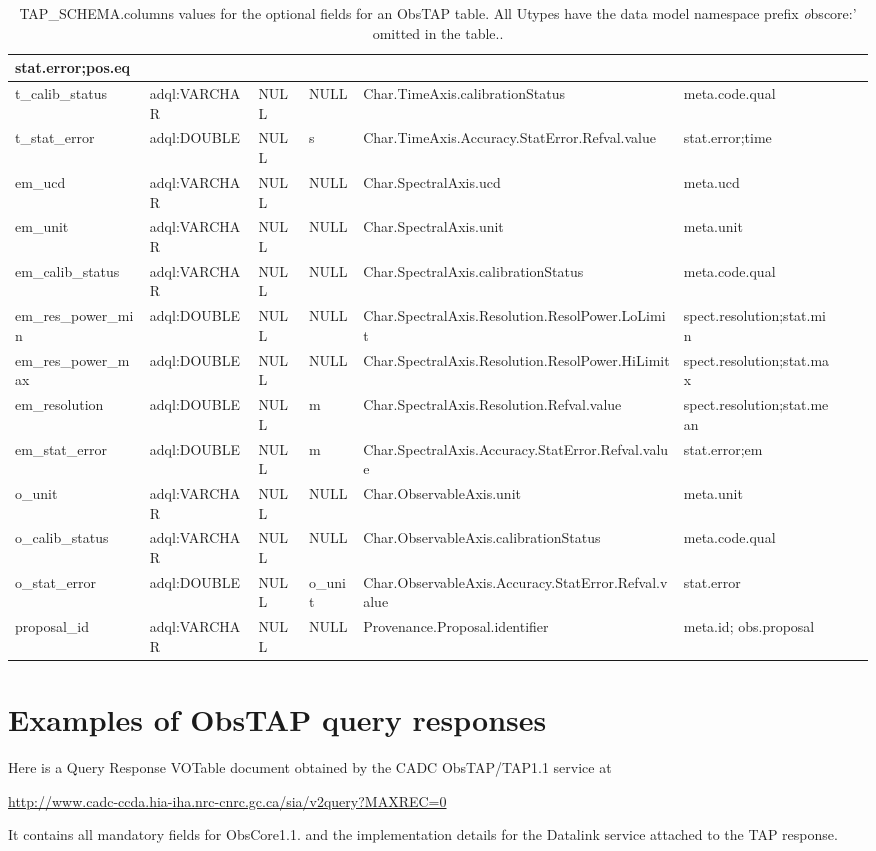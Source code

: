 \documentclass[11pt,a4paper]{ivoa}
\begin{document}
\begin{table}
\begin{tabular}{ | l | l | l | l | l | l | l | l}
stat.error;pos.eq
\\\hline
t\_calib\_status &
adql:VARCHAR &
NULL &
NULL &
Char.TimeAxis.calibrationStatus &
meta.code.qual
\\\hline
t\_stat\_error &
adql:DOUBLE &
NULL &
s &
Char.TimeAxis.Accuracy.StatError.Refval.value &
stat.error;time
\\\hline
em\_ucd &
adql:VARCHAR &
NULL &
NULL &
Char.SpectralAxis.ucd &
meta.ucd
\\\hline
em\_unit &
adql:VARCHAR &
NULL &
NULL &
Char.SpectralAxis.unit &
meta.unit
\\\hline
em\_calib\_status &
adql:VARCHAR &
NULL &
NULL &
Char.SpectralAxis.calibrationStatus &
meta.code.qual
\\\hline
em\_res\_power\_min &
adql:DOUBLE &
NULL &
NULL  &
Char.SpectralAxis.Resolution.ResolPower.LoLimit &
spect.resolution;stat.min
\\\hline
em\_res\_power\_max &
adql:DOUBLE &
NULL &
NULL &
Char.SpectralAxis.Resolution.ResolPower.HiLimit &
spect.resolution;stat.max
\\\hline
em\_resolution &
adql:DOUBLE &
NULL &
m &
Char.SpectralAxis.Resolution.Refval.value &
spect.resolution;stat.mean
\\\hline
em\_stat\_error &
adql:DOUBLE &
NULL &
m &
Char.SpectralAxis.Accuracy.StatError.Refval.value &
stat.error;em
\\\hline
o\_unit &
adql:VARCHAR &
NULL &
NULL &
Char.ObservableAxis.unit &
meta.unit
\\\hline
o\_calib\_status &
adql:VARCHAR &
NULL &
NULL &
Char.ObservableAxis.calibrationStatus &
meta.code.qual
\\\hline
o\_stat\_error &
adql:DOUBLE &
NULL &
o\_unit &
Char.ObservableAxis.Accuracy.StatError.Refval.value &
stat.error
\\\hline
proposal\_id &
adql:VARCHAR &
NULL &
NULL &
Provenance.Proposal.identifier &
meta.id; obs.proposal
\\\hline
\end{tabular}
\caption{TAP\_SCHEMA.columns values for the optional fields for an ObsTAP table.  All Utypes have the data model namespace prefix {\emph obscore:'} omitted in the table..}
\label{table:tapschema-optional}
\end{table}

\section{Examples of ObsTAP query responses}
Here is a Query Response VOTable document obtained by the CADC ObsTAP/TAP1.1 service at

\url{http://www.cadc-ccda.hia-iha.nrc-cnrc.gc.ca/sia/v2query?MAXREC=0}

It contains all mandatory fields for ObsCore1.1. and the implementation details for the Datalink service attached to the
TAP response.


\end{document}
